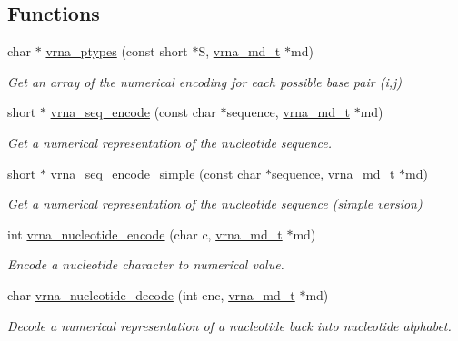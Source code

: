 \subsection*{Functions}
\begin{DoxyCompactItemize}
\item 
char $\ast$ \hyperlink{group__alphabet__utils_ga51a9e86a5f731f5f2f5584ee67cee4a8}{vrna\+\_\+ptypes} (const short $\ast$S, \hyperlink{group__model__details_ga1f8a10e12a0a1915f2a4eff0b28ea17c}{vrna\+\_\+md\+\_\+t} $\ast$md)
\begin{DoxyCompactList}\small\item\em Get an array of the numerical encoding for each possible base pair (i,j) \end{DoxyCompactList}\item 
\mbox{\label{group__alphabet__utils_ga636e7d6f888fd639587296a5eddea660}} 
short $\ast$ \hyperlink{group__alphabet__utils_ga636e7d6f888fd639587296a5eddea660}{vrna\+\_\+seq\+\_\+encode} (const char $\ast$sequence, \hyperlink{group__model__details_ga1f8a10e12a0a1915f2a4eff0b28ea17c}{vrna\+\_\+md\+\_\+t} $\ast$md)
\begin{DoxyCompactList}\small\item\em Get a numerical representation of the nucleotide sequence. \end{DoxyCompactList}\item 
\mbox{\label{group__alphabet__utils_ga3cd79d21d53248ad2634c1c0d43e97d7}} 
short $\ast$ \hyperlink{group__alphabet__utils_ga3cd79d21d53248ad2634c1c0d43e97d7}{vrna\+\_\+seq\+\_\+encode\+\_\+simple} (const char $\ast$sequence, \hyperlink{group__model__details_ga1f8a10e12a0a1915f2a4eff0b28ea17c}{vrna\+\_\+md\+\_\+t} $\ast$md)
\begin{DoxyCompactList}\small\item\em Get a numerical representation of the nucleotide sequence (simple version) \end{DoxyCompactList}\item 
int \hyperlink{group__alphabet__utils_gac12bf00123f88621c9be847b0879c1fb}{vrna\+\_\+nucleotide\+\_\+encode} (char c, \hyperlink{group__model__details_ga1f8a10e12a0a1915f2a4eff0b28ea17c}{vrna\+\_\+md\+\_\+t} $\ast$md)
\begin{DoxyCompactList}\small\item\em Encode a nucleotide character to numerical value. \end{DoxyCompactList}\item 
char \hyperlink{group__alphabet__utils_ga48ef585e697be9c8a08ed68c655e29b6}{vrna\+\_\+nucleotide\+\_\+decode} (int enc, \hyperlink{group__model__details_ga1f8a10e12a0a1915f2a4eff0b28ea17c}{vrna\+\_\+md\+\_\+t} $\ast$md)
\begin{DoxyCompactList}\small\item\em Decode a numerical representation of a nucleotide back into nucleotide alphabet. \end{DoxyCompactList}\end{DoxyCompactItemize}


